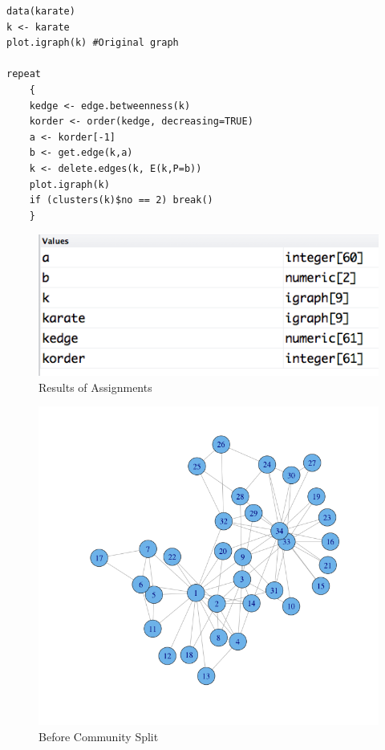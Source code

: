 \documentclass{article}
\begin{document}
\begin{lstlisting}[frame=single, caption=karateClub.R, label=code]
data(karate)
k <- karate
plot.igraph(k) #Original graph

repeat
	{
	kedge <- edge.betweenness(k)
	korder <- order(kedge, decreasing=TRUE)
	a <- korder[-1]
	b <- get.edge(k,a)
	k <- delete.edges(k, E(k,P=b))
	plot.igraph(k)
	if (clusters(k)$no == 2) break()
	}
\end{lstlisting}

\begin{figure}[H]
\centering
\includegraphics[scale=0.50]{q1/types}
\caption{Results of Assignments}
\label{types}
\end{figure}


\begin{figure}[H]
\centering
\includegraphics[scale=0.50]{q1/original}
\caption{Before Community Split}
\label{before}
\end{figure}
\end{document}
